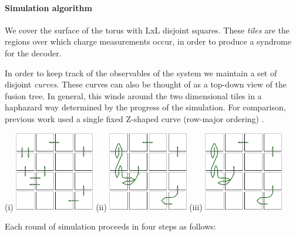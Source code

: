 \documentclass[aps, prl, letterpaper, twocolumn, superscriptaddress, notitlepage]{revtex4-1}
\begin{document}
	\paragraph{Simulation algorithm}\label{s:simalg}

		We cover the surface of the torus with LxL disjoint squares. These {\it tiles} are the regions over which
charge measurements occur, in order to produce a syndrome for the decoder.

		In order to keep track of the observables of the system we maintain a set of disjoint {\it curves}. These curves can also be thought of as a top-down view of the fusion tree. In general, this winds around the two dimensional tiles in a haphazard way determined by the progress of the simulation. For comparison, previous work used a single fixed Z-shaped curve (row-major ordering) \cite{Brell2013}.

		\begin{center}
		(i)
		\includegraphics[width=0.26\textwidth]{pair-create.pdf}
		\hskip 10pt
		(ii)
		\includegraphics[width=0.26\textwidth]{syndrome-1.pdf}
		\hskip 10pt
		(iii)
		\includegraphics[width=0.26\textwidth]{syndrome-2.pdf}
		\end{center}

		Each round of simulation proceeds in four steps as follows:
\end{document}
